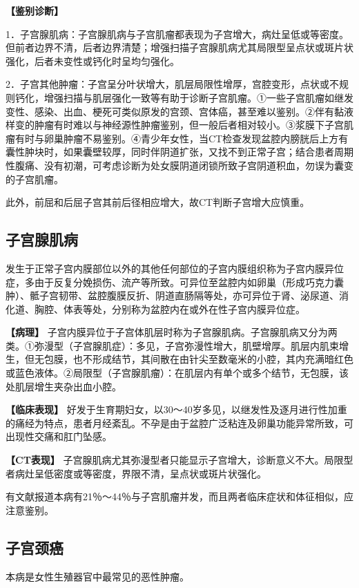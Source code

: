 \textbf{【鉴别诊断】}

1．子宫腺肌病：子宫腺肌病与子宫肌瘤都表现为子宫增大，病灶呈低或等密度。但前者边界不清，后者边界清楚；增强扫描子宫腺肌病尤其局限型呈点状或斑片状强化，后者未变性或钙化时呈均匀强化。

2．子宫其他肿瘤：子宫呈分叶状增大，肌层局限性增厚，宫腔变形，点状或不规则钙化，增强扫描与肌层强化一致等有助于诊断子宫肌瘤。①一些子宫肌瘤如继发变性、感染、出血、梗死可类似原发的宫颈、宫体癌，甚至难以鉴别。②伴有黏液样变的肿瘤有时难以与神经源性肿瘤鉴别，但一般后者相对较小。③浆膜下子宫肌瘤有时与卵巢肿瘤不易鉴别。④青少年女性，当CT检查发现盆腔内膀胱后上方有囊性肿块时，如果囊壁较厚，同时伴阴道扩张，又找不到正常子宫；结合患者周期性腹痛、没有初潮，可考虑诊断为处女膜阴道闭锁所致子宫阴道积血，勿误为囊变的子宫肌瘤。

此外，前屈和后屈子宫其前后径相应增大，故CT判断子宫增大应慎重。

\subsection{子宫腺肌病}

发生于正常子宫内膜部位以外的其他任何部位的子宫内膜组织称为子宫内膜异位症，多由于反复分娩损伤、流产等所致。可异位至盆腔内如卵巢（形成巧克力囊肿）、骶子宫韧带、盆腔腹膜反折、阴道直肠隔等处，亦可异位于肾、泌尿道、消化道、胸腔、体表等处，分别称为盆腔内在或外在性子宫内膜异位症。

\textbf{【病理】}
子宫内膜异位于子宫体肌层时称为子宫腺肌病。子宫腺肌病又分为两类。①弥漫型（子宫腺肌症）：多见，子宫弥漫性增大，肌壁增厚。肌层内肌束增生，但无包膜，也不形成结节，其间散在由针尖至数毫米的小腔，其内充满暗红色或蓝色液体。②局限型（子宫腺肌瘤）：在肌层内有单个或多个结节，无包膜，该处肌层增生夹杂出血小腔。

\textbf{【临床表现】}
好发于生育期妇女，以30～40岁多见，以继发性及逐月进行性加重的痛经为特点，患者月经紊乱。不孕是由于盆腔广泛粘连及卵巢功能异常所致，可出现性交痛和肛门坠感。

\textbf{【CT表现】}
子宫腺肌病尤其弥漫型者只能显示子宫增大，诊断意义不大。局限型者病灶呈低密度或等密度，界限不清，呈点状或斑片状强化。

有文献报道本病有21％～44％与子宫肌瘤并发，而且两者临床症状和体征相似，应注意鉴别。

\subsection{子宫颈癌}

本病是女性生殖器官中最常见的恶性肿瘤。

